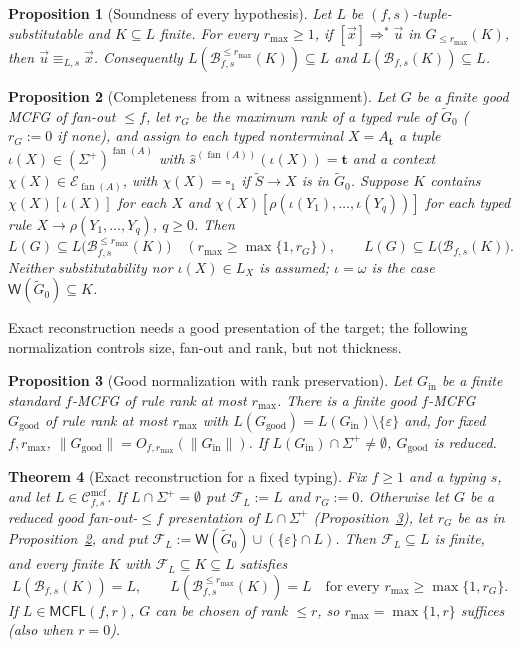 \documentclass[11pt]{article}
\numberwithin{equation}{section}
\theoremstyle{plain}
\newtheorem{theorem}{Theorem}[section]
\newtheorem{proposition}[theorem]{Proposition}
\theoremstyle{definition}
\theoremstyle{remark}
\newcommand{\Wit}{\mathsf{W}}
\newcommand{\Cmcf}[2]{\mathcal{C}^{\mathrm{mcf}}_{#1,#2}}
\newcommand{\tuple}[1]{\vec{#1}}
\newcommand{\blank}{\square}
\newcommand{\eps}{\varepsilon}
\newcommand{\fan}{\operatorname{fan}}
\begin{document}
\begin{proposition}[Soundness of every hypothesis]
\label{prop:reconstruction-soundness}
Let $L$ be $(f,s)$-tuple-substitutable and $K\subseteq L$ finite.  For every
$r_{\max}\ge1$, if $[\tuple x]\Rightarrow^*\tuple u$ in
$\widehat G_{\le r_{\max}}(K)$, then $\tuple u\equiv_{L,s}\tuple x$.
Consequently $L(\mathcal B_{f,s}^{\le r_{\max}}(K))\subseteq L$ and
$L(\mathcal B_{f,s}(K))\subseteq L$.
\end{proposition}

\begin{proposition}[Completeness from a witness assignment]
\label{prop:completeness}
Let $G$ be a finite good MCFG of fan-out $\le f$, let $r_G$ be the maximum
rank of a typed rule of $\widetilde G_0$ ($r_G:=0$ if none), and assign to
each typed nonterminal $X=A_{\mathbf t}$ a tuple
$\iota(X)\in(\Sigma^+)^{\fan(A)}$ with $\widehat s^{(\fan(A))}(\iota(X))=\mathbf t$
and a context $\chi(X)\in\mathcal E_{\fan(A)}$, with $\chi(X)=\blank_1$ if
$\widetilde S\to X$ is in $\widetilde G_0$.  Suppose $K$ contains
$\chi(X)[\iota(X)]$ for each $X$ and
$\chi(X)[\rho(\iota(Y_1),\ldots,\iota(Y_q))]$ for each
typed rule $X\to\rho(Y_1,\ldots,Y_q)$, $q\ge0$.  Then
\[
 L(G)\subseteq L\bigl(\mathcal B_{f,s}^{\le r_{\max}}(K)\bigr)
 \quad(r_{\max}\ge\max\{1,r_G\}),\qquad
 L(G)\subseteq L\bigl(\mathcal B_{f,s}(K)\bigr).
\]
Neither substitutability nor $\iota(X)\in L_X$ is assumed;
$\iota=\omega$ is the case $\Wit(\widetilde G_0)\subseteq K$.
\end{proposition}

Exact reconstruction needs a good presentation of the target; the following
normalization controls size, fan-out and rank, but not thickness.

\begin{proposition}[Good normalization with rank preservation]
\label{prop:good-normalization}
Let $G_{\mathrm{in}}$ be a finite standard $f$-MCFG of rule rank at most
$r_{\max}$.  There is a finite good $f$-MCFG $G_{\mathrm{good}}$ of rule rank at
most $r_{\max}$ with $L(G_{\mathrm{good}})=L(G_{\mathrm{in}})\setminus\{\eps\}$
and, for fixed $f,r_{\max}$,
$\|G_{\mathrm{good}}\|=O_{f,r_{\max}}(\|G_{\mathrm{in}}\|)$.  If
$L(G_{\mathrm{in}})\cap\Sigma^+\ne\emptyset$, $G_{\mathrm{good}}$ is reduced.
\end{proposition}

\begin{theorem}[Exact reconstruction for a fixed typing]
\label{thm:exact-reconstruction}
Fix $f\ge1$ and a typing $s$, and let $L\in\Cmcf{f}{s}$.  If
$L\cap\Sigma^+=\emptyset$ put $\mathcal F_L:=L$ and $r_G:=0$.  Otherwise let $G$
be a reduced good fan-out-$\le f$ presentation of $L\cap\Sigma^+$
(Proposition~\ref{prop:good-normalization}), let $r_G$ be as in
Proposition~\ref{prop:completeness}, and put
$\mathcal F_L:=\Wit(\widetilde G_0)\cup(\{\eps\}\cap L)$.  Then
$\mathcal F_L\subseteq L$ is finite, and every finite $K$ with
$\mathcal F_L\subseteq K\subseteq L$ satisfies
\[
 L(\mathcal B_{f,s}(K))=L,\qquad
 L(\mathcal B_{f,s}^{\le r_{\max}}(K))=L\quad
 \text{for every }r_{\max}\ge\max\{1,r_G\}.
\]
If $L\in\mathsf{MCFL}(f,r)$, $G$ can be chosen of rank $\le r$, so
$r_{\max}=\max\{1,r\}$ suffices (also when $r=0$).
\end{theorem}
\end{document}
